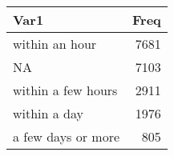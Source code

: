 
\begin{tabular}[t]{lr}
\toprule
Var1 & Freq\\
\midrule
within an hour & 7681\\
NA & 7103\\
within a few hours & 2911\\
within a day & 1976\\
a few days or more & 805\\
\bottomrule
\end{tabular}